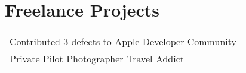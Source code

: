 \documentclass[a4paper]{lyu-resume} %
\begin{document}
\begin{minipage}[t]{0.66\textwidth}
\sectionspace %


\section{Freelance Projects} 

\begin{tabular}{l}
\textbullet{} Contributed 3 defects to Apple Developer Community\\
\textbullet{} Private Pilot \textbullet{} Photographer \textbullet{} Travel Addict

\end{tabular}

\sectionspace %


\end{minipage} %








\end{document}
